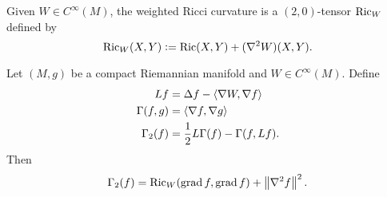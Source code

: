 \begin{defn}
    Given $W \in C^\infty(M)$, the weighted Ricci curvature is a $(2,0)$-tensor $\operatorname{Ric}_W$ defined by
    \begin{equation*}
        \operatorname{Ric}_W(X,Y) \vcentcolon= \operatorname{Ric}(X,Y) + (\nabla^2 W)(X,Y).
    \end{equation*}
\end{defn}

\begin{prop}
    Let $(M,g)$ be a compact Riemannian manifold and $W \in C^\infty(M)$. Define
    \begin{align*}
        Lf &= \Delta f - \left\langle \nabla W, \nabla f \right\rangle \\
        \Gamma(f,g) &= \left\langle \nabla f, \nabla g \right\rangle \\
        \Gamma_2(f) &= \frac{1}{2}L\Gamma(f) - \Gamma(f,Lf).
    \end{align*}
    Then
    \begin{equation*}
        \Gamma_2(f) = \operatorname{Ric}_W(\operatorname{grad} f,\operatorname{grad} f) + \left\lVert\nabla^2 f\right\lVert^2.
    \end{equation*}
\end{prop}
